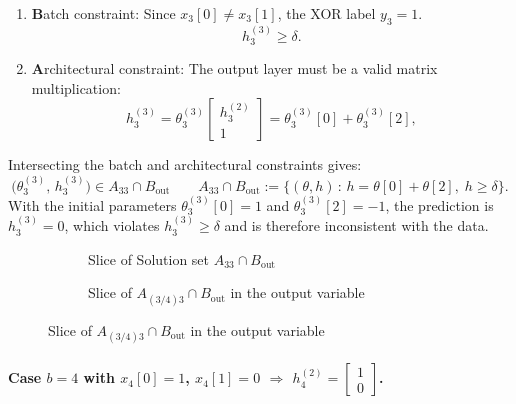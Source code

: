 \begin{enumerate}
  \item \textbf{B}atch constraint: Since $x_3[0]\ne x_3[1]$, the XOR label $y_3=1$. 
\begin{equation*}
h_3^{(3)} \ge \delta.
\end{equation*}

\item \textbf{A}rchitectural constraint: The output layer must be a valid matrix multiplication:
\begin{equation*}
h_3^{(3)} = \theta_3^{(3)} \begin{bmatrix} h_3^{(2)} \\ 1 \end{bmatrix}
= \theta_3^{(3)}[0] + \theta_3^{(3)}[2],
\end{equation*}
\end{enumerate}
Intersecting the batch and architectural constraints gives:
\begin{equation*}
  \bigl(\theta_3^{(3)},\, h_3^{(3)}\bigr) \in A_{33} \cap B_{\mathrm{out}} \qquad
  A_{33} \cap B_{\mathrm{out}} := \bigl\{(\theta,h) \,:\, h = \theta[0] + \theta[2],\; h \ge \delta\bigr\}.
\end{equation*}
With the initial parameters $\theta_3^{(3)}[0] = 1$ and $\theta_3^{(3)}[2] = -1$,
the prediction is $h_3^{(3)} = 0$, which violates $h_3^{(3)} \ge \delta$ and is therefore inconsistent with the data.
\\
\begin{figure}[h]
\centering
\begin{subfigure}[t]{0.48\textwidth}
\centering

\caption{Slice of Solution set $A_{33} \cap B_{\mathrm{out}}$}
\label{fig:xor_output_relation_w1_wb_pos}
\end{subfigure}
\hfill
\begin{subfigure}[t]{0.48\textwidth}
\centering

\caption{Slice of $A_{(3/4)3}  \cap B_{\mathrm{out}}$ in the output variable }
\label{fig:xor_pos_y}
\end{subfigure}
\label{fig:xor_output_relation_pos}
\end{figure}

\paragraph{Case $b=4$ with $x_4[0]=1$, $x_4[1]=0$ $\Rightarrow$
$h_4^{(2)} =\begin{bmatrix} 1 \\ 0 \end{bmatrix}$.}

